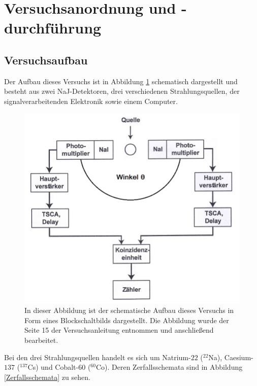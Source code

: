 \section{Versuchsanordnung und -durchführung}

\subsection{Versuchsaufbau}

Der Aufbau dieses Versuchs ist in Abbildung \ref{schaltung} schematisch dargestellt und besteht aus zwei NaJ-Detektoren, drei verschiedenen Strahlungsquellen, der signalverarbeitenden Elektronik sowie einem Computer.
\begin{figure}[H]
	\centering
	\includegraphics[width=1.0\textwidth]{img/schaltung}
	\caption{In dieser Abbildung ist der schematische Aufbau dieses Versuchs in Form eines Blockschaltbilds dargestellt. Die Abbildung wurde der Seite 15 der Versuchsanleitung\cite{wwu} entnommen und anschließend bearbeitet.}
	\label{schaltung}
\end{figure}
\noindent Bei den drei Strahlungsquellen handelt es sich um Natrium-$22$ ($^{22}$Na), Caesium-$137$ ($^{137}$Cs) und Cobalt-$60$ ($^{60}$Co).
Deren Zerfallsschemata sind in Abbildung \ref{Zerfallsschemata} zu sehen.
